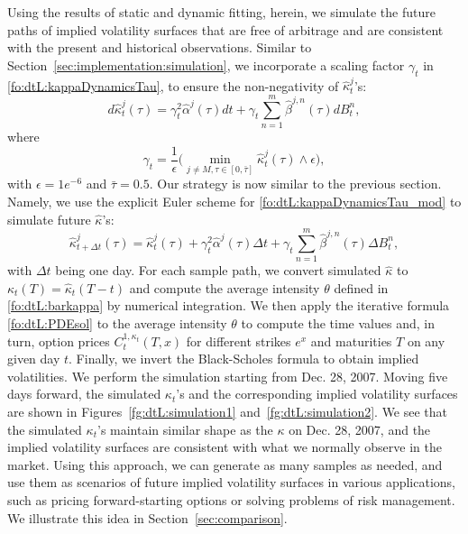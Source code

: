 \documentclass{article}
\numberwithin{equation}{section}
\def\halpha{\hat{\alpha}}
\def\hbeta{\hat{\beta}}
\def\hkappa{\hat{\kappa}}
\begin{document}
Using the results of static and dynamic fitting, herein, we simulate the future paths of implied volatility surfaces that are free of arbitrage and are consistent with the present and historical observations. 
Similar to Section~\ref{sec:implementation:simulation}, we incorporate a scaling factor $\gamma_t$ in \eqref{fo:dtL:kappaDynamicsTau}, to ensure the non-negativity of $\hkappa_t^j$'s:
\begin{equation}\label{fo:dtL:kappaDynamicsTau_mod}
d\hat{\kappa}_{t}^j(\tau) = \gamma_t^2 \hat{\alpha}^j(\tau) dt + \gamma_t \sum_{n=1}^m \hat{\beta}^{j,n}(\tau) dB_t^n,
\end{equation}
where 
\begin{equation}\label{fo:dtL:gammat}
\gamma_t = \frac{1}{\epsilon} \bigg(\min_{ j\neq M, \tau \in [0, \bar{\tau}]} \hkappa_t^j(\tau) \land \epsilon\bigg),
\end{equation}
with $\epsilon = 1e^{-6}$ and $\bar{\tau}=0.5$. 
Our strategy is now similar to the previous section. Namely, we use the explicit Euler scheme for \eqref{fo:dtL:kappaDynamicsTau_mod} to simulate future $\hat{\kappa}$'s: 
\begin{equation}\label{eq.dtl.Euler}
\hkappa_{t+\Delta t}^j(\tau) = \hkappa_t^j(\tau) + \gamma_t^2\halpha^j(\tau) \Delta t+ \gamma_t \sum_{n=1}^m \hbeta^{j,n}(\tau) \Delta B^n_t, 
\end{equation} 
with $\Delta t$ being one day.
For each sample path, we convert simulated $\hat{\kappa}$ to $\kappa_t(T) = \hat{\kappa}_t(T-t)$ and compute the average intensity $\theta$ defined in \eqref{fo:dtL:barkappa} by numerical integration. We then apply the iterative formula \eqref{fo:dtL:PDEsol} to the average intensity $\theta$ to compute the time values and, in turn, option prices $C^{1,\kappa_t}_t(T,x)$ for different strikes $e^x$ and maturities $T$ on any given day $t$. Finally, we invert the Black-Scholes formula to obtain implied volatilities. 
We perform the simulation starting from Dec. 28, 2007. Moving five days forward,
the simulated $\kappa_t$'s and the corresponding implied volatility surfaces are shown in Figures~\ref{fg:dtL:simulation1} and~\ref{fg:dtL:simulation2}. We see that the simulated $\kappa_t$'s maintain similar shape as the $\kappa$  on Dec. 28, 2007, and the implied volatility surfaces are consistent with what we normally observe in the market. Using this approach, we can generate as many samples as needed, and use them as scenarios of future implied volatility surfaces in various applications, such as pricing forward-starting options or solving problems of risk management. We illustrate this idea in Section~\ref{sec:comparison}.
\end{document}
